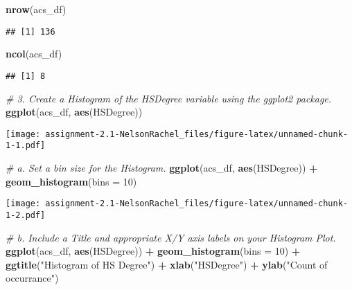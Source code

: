 \documentclass[
]{article}
\newenvironment{Shaded}{\begin{snugshade}}{\end{snugshade}}
\newcommand{\CommentTok}[1]{\textcolor[rgb]{0.56,0.35,0.01}{\textit{#1}}}
\newcommand{\DataTypeTok}[1]{\textcolor[rgb]{0.13,0.29,0.53}{#1}}
\newcommand{\DecValTok}[1]{\textcolor[rgb]{0.00,0.00,0.81}{#1}}
\newcommand{\KeywordTok}[1]{\textcolor[rgb]{0.13,0.29,0.53}{\textbf{#1}}}
\newcommand{\NormalTok}[1]{#1}
\newcommand{\OperatorTok}[1]{\textcolor[rgb]{0.81,0.36,0.00}{\textbf{#1}}}
\newcommand{\StringTok}[1]{\textcolor[rgb]{0.31,0.60,0.02}{#1}}
\begin{document}
\begin{Shaded}
\begin{Highlighting}[]
\KeywordTok{nrow}\NormalTok{(acs_df)}
\end{Highlighting}
\end{Shaded}

\begin{verbatim}
## [1] 136
\end{verbatim}

\begin{Shaded}
\begin{Highlighting}[]
\KeywordTok{ncol}\NormalTok{(acs_df)}
\end{Highlighting}
\end{Shaded}

\begin{verbatim}
## [1] 8
\end{verbatim}

\begin{Shaded}
\begin{Highlighting}[]
\CommentTok{# 3. Create a Histogram of the HSDegree variable using the ggplot2 package.}
\KeywordTok{ggplot}\NormalTok{(acs_df, }\KeywordTok{aes}\NormalTok{(HSDegree))}
\end{Highlighting}
\end{Shaded}

\texttt{[image: assignment-2.1-NelsonRachel\_files/figure-latex/unnamed-chunk-1-1.pdf]}

\begin{Shaded}
\begin{Highlighting}[]
\CommentTok{#   a. Set a bin size for the Histogram.}
\KeywordTok{ggplot}\NormalTok{(acs_df, }\KeywordTok{aes}\NormalTok{(HSDegree)) }\OperatorTok{+}\StringTok{ }\KeywordTok{geom_histogram}\NormalTok{(}\DataTypeTok{bins =} \DecValTok{10}\NormalTok{)}
\end{Highlighting}
\end{Shaded}

\texttt{[image: assignment-2.1-NelsonRachel\_files/figure-latex/unnamed-chunk-1-2.pdf]}

\begin{Shaded}
\begin{Highlighting}[]
\CommentTok{#   b. Include a Title and appropriate X/Y axis labels on your Histogram Plot.}
\KeywordTok{ggplot}\NormalTok{(acs_df, }\KeywordTok{aes}\NormalTok{(HSDegree)) }\OperatorTok{+}\StringTok{ }\KeywordTok{geom_histogram}\NormalTok{(}\DataTypeTok{bins =} \DecValTok{10}\NormalTok{) }\OperatorTok{+}\StringTok{ }\KeywordTok{ggtitle}\NormalTok{(}\StringTok{"Histogram of HS Degree"}\NormalTok{) }\OperatorTok{+}\StringTok{ }\KeywordTok{xlab}\NormalTok{(}\StringTok{"HSDegree"}\NormalTok{) }\OperatorTok{+}\StringTok{ }\KeywordTok{ylab}\NormalTok{(}\StringTok{"Count of occurrance"}\NormalTok{) }
\end{Highlighting}
\end{Shaded}
\end{document}
